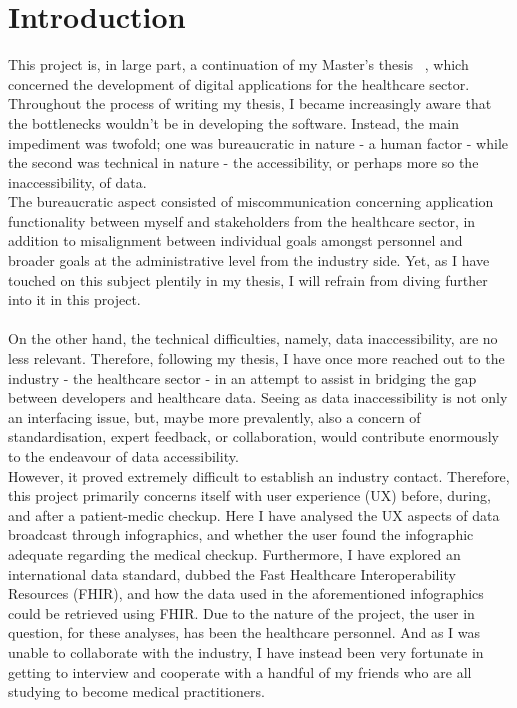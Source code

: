 \section{Introduction}
This project is, in large part, a continuation of my Master's thesis ~\cite{thesis}, which concerned the development of digital applications for the healthcare sector. Throughout the process of writing my thesis, I became increasingly aware that the bottlenecks wouldn't be in developing the software. Instead, the main impediment was twofold; one was bureaucratic in nature - a human factor - while the second was technical in nature - the accessibility, or perhaps more so the inaccessibility, of data.
\\
The bureaucratic aspect consisted of miscommunication concerning application functionality between myself and stakeholders from the healthcare sector, in addition to misalignment between individual goals amongst personnel and broader goals at the administrative level from the industry side. Yet, as I have touched on this subject plentily in my thesis, I will refrain from diving further into it in this project. 
\\
\\
On the other hand, the technical difficulties, namely, data inaccessibility, are no less relevant. Therefore, following my thesis, I have once more reached out to the industry - the healthcare sector - in an attempt to assist in bridging the gap between developers and healthcare data. Seeing as data inaccessibility is not only an interfacing issue, but, maybe more prevalently, also a concern of standardisation, expert feedback, or collaboration, would contribute enormously to the endeavour of data accessibility.
\\
However, it proved extremely difficult to establish an industry contact. Therefore, this project primarily concerns itself with user experience (UX) before, during, and after a patient-medic checkup. Here I have analysed the UX aspects of data broadcast through infographics, and whether the user found the infographic adequate regarding the medical checkup. Furthermore, I have explored an international data standard, dubbed the Fast Healthcare Interoperability Resources (FHIR), and how the data used in the aforementioned infographics could be retrieved using FHIR.
Due to the nature of the project, the user in question, for these analyses, has been the healthcare personnel. And as I was unable to collaborate with the industry, I have instead been very fortunate in getting to interview and cooperate with a handful of my friends who are all studying to become medical practitioners.   

